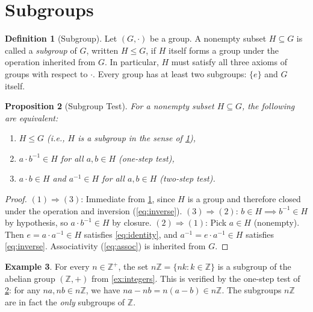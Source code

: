 \documentclass[12pt,a4paper]{article}
\theoremstyle{definition}
\newtheorem{definition}{Definition}[section]
\newtheorem{example}[definition]{Example}
\theoremstyle{plain}
\newtheorem{proposition}[definition]{Proposition}
\theoremstyle{remark}
\newcommand{\Z}{\mathbb{Z}}
\begin{document}
\section{Subgroups}\label{sec:subgroups}

\begin{definition}[Subgroup]\label{def:subgroup}
Let $(G, \cdot)$ be a group. A nonempty subset $H \subseteq G$
is called a \emph{subgroup} of $G$, written $H \leq G$, if $H$ itself forms a group
under the operation inherited from $G$. In particular, $H$ must satisfy all three
axioms of groups with respect to $\cdot$.
Every group has at least two subgroups: $\{e\}$ and $G$ itself.
\end{definition}

\begin{proposition}[Subgroup Test]\label{prop:subgroup-test}
For a nonempty subset $H \subseteq G$, the following are equivalent:
\begin{enumerate}
    \item $H \leq G$ \quad (i.e., $H$ is a subgroup in the sense of \cref{def:subgroup}),
    \item $a \cdot b^{-1} \in H$ for all $a, b \in H$ \quad (one-step test),
    \item $a \cdot b \in H$ and $a^{-1} \in H$ for all $a, b \in H$ \quad (two-step test).
\end{enumerate}
\end{proposition}

\begin{proof}
$(1) \Rightarrow (3)$: Immediate from \cref{def:subgroup}, since $H$ is a group
and therefore closed under the operation and inversion (\cref{eq:inverse}).
$(3) \Rightarrow (2)$: $b \in H \implies b^{-1} \in H$ by hypothesis, so
$a \cdot b^{-1} \in H$ by closure.
$(2) \Rightarrow (1)$: Pick $a \in H$ (nonempty). Then $e = a \cdot a^{-1} \in H$
satisfies \cref{eq:identity}, and $a^{-1} = e \cdot a^{-1} \in H$ satisfies
\cref{eq:inverse}. Associativity (\cref{eq:assoc}) is inherited from $G$.
\end{proof}

\begin{example}\label{ex:nZ}
For every $n \in \Z^+$, the set $n\Z = \{nk : k \in \Z\}$ is a subgroup of
the abelian group $(\Z, +)$ from \cref{ex:integers}.
This is verified by the one-step test of \cref{prop:subgroup-test}: for any
$na, nb \in n\Z$, we have $na - nb = n(a - b) \in n\Z$.
The subgroups $n\Z$ are in fact the \emph{only} subgroups of $\Z$.
\end{example}
\end{document}
